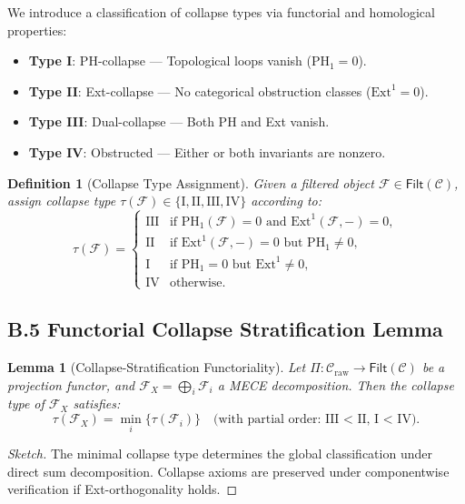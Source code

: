 \documentclass[11pt]{article}
\newtheorem{definition}[theorem]{Definition}
\newtheorem{lemma}[theorem]{Lemma}
\begin{document}
We introduce a classification of collapse types via functorial and homological properties:

\begin{itemize}
  \item \textbf{Type I}: PH-collapse — Topological loops vanish (\( \mathrm{PH}_1 = 0 \)).
  \item \textbf{Type II}: Ext-collapse — No categorical obstruction classes (\( \mathrm{Ext}^1 = 0 \)).
  \item \textbf{Type III}: Dual-collapse — Both PH and Ext vanish.
  \item \textbf{Type IV}: Obstructed — Either or both invariants are nonzero.
\end{itemize}

\begin{definition}[Collapse Type Assignment]
Given a filtered object \( \mathcal{F} \in \mathsf{Filt}(\mathcal{C}) \), assign collapse type \( \tau(\mathcal{F}) \in \{\text{I}, \text{II}, \text{III}, \text{IV}\} \) according to:
\[
\tau(\mathcal{F}) =
\begin{cases}
\text{III} & \text{if } \mathrm{PH}_1(\mathcal{F}) = 0 \text{ and } \mathrm{Ext}^1(\mathcal{F}, -) = 0, \\
\text{II}  & \text{if } \mathrm{Ext}^1(\mathcal{F}, -) = 0 \text{ but } \mathrm{PH}_1 \ne 0, \\
\text{I}   & \text{if } \mathrm{PH}_1 = 0 \text{ but } \mathrm{Ext}^1 \ne 0, \\
\text{IV}  & \text{otherwise}.
\end{cases}
\]
\end{definition}

\subsection*{B.5 Functorial Collapse Stratification Lemma}

\begin{lemma}[Collapse-Stratification Functoriality]
Let \( \Pi: \mathcal{C}_{\mathrm{raw}} \to \mathsf{Filt}(\mathcal{C}) \) be a projection functor,  
and \( \mathcal{F}_X = \bigoplus_i \mathcal{F}_i \) a MECE decomposition.  
Then the collapse type of \( \mathcal{F}_X \) satisfies:
\[
\tau(\mathcal{F}_X) = \min_i \{ \tau(\mathcal{F}_i) \}
\quad \text{(with partial order: III < II, I < IV)}.
\]
\end{lemma}

\begin{proof}[Sketch]
The minimal collapse type determines the global classification under direct sum decomposition.  
Collapse axioms are preserved under componentwise verification if Ext-orthogonality holds.
\end{proof}
\end{document}
